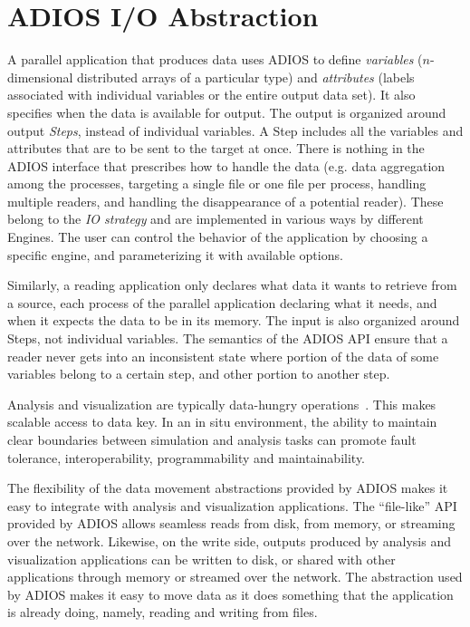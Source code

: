 \section{ADIOS I/O Abstraction}
\label{sec:adios}

A parallel application that produces data uses ADIOS to define \emph{variables} ($n$-dimensional distributed arrays of a particular type) and \emph{attributes} (labels associated with individual variables or the entire output data set).
It also specifies when the data is available for output. The output is organized around output \emph{Steps}, instead of individual variables.
A Step includes all the variables and attributes that are to be sent to the target at once.
There is nothing in the ADIOS interface that prescribes how to handle the data (e.g. data aggregation among the processes, targeting a single file or one file per process, handling multiple readers, and handling the disappearance of a potential reader).
These belong to the \emph{IO strategy} and are implemented in various ways by different Engines.
The user can control the behavior of the application by choosing a specific engine, and parameterizing it with available options. 

Similarly, a reading application only declares what data it wants to retrieve from a source, each process of the parallel application declaring what it needs, and when it expects the data to be in its memory.
The input is also organized around Steps, not individual variables. The semantics of the ADIOS API  ensure that a reader never gets into an inconsistent state where portion of the data of some variables belong to a certain step, and other portion to another step.

Analysis and visualization are typically data-hungry operations~\cite{Childs2010}. This makes scalable access to data key. In an in situ environment, the ability to maintain clear boundaries between simulation and analysis tasks can promote fault tolerance, interoperability, programmability and maintainability.  


The flexibility of the data movement abstractions provided by ADIOS makes it easy to integrate with analysis and visualization applications. The ``file-like'' API provided by ADIOS allows seamless reads from disk, from memory, or streaming over the network.
Likewise, on the write side, outputs produced by analysis and visualization applications can be written to disk, or shared with other applications through memory or streamed over the network. The abstraction used by ADIOS makes it easy to move data as it does something that the application is already doing, namely, reading and writing from files.

